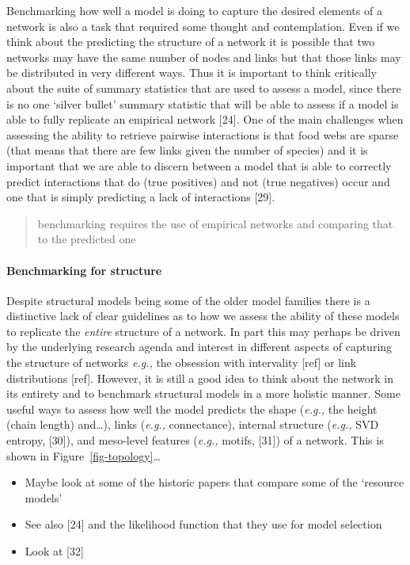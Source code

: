 \documentclass[
]{article}
\let\oldparagraph\paragraph
\renewcommand{\paragraph}[1]{\oldparagraph{#1}\mbox{}}
\begin{document}
Benchmarking how well a model is doing to capture the desired elements
of a network is also a task that required some thought and
contemplation. Even if we think about the predicting the structure of a
network it is possible that two networks may have the same number of
nodes and links but that those links may be distributed in very
different ways. Thus it is important to think critically about the suite
of summary statistics that are used to assess a model, since there is no
one `silver bullet' summary statistic that will be able to assess if a
model is able to fully replicate an empirical network {[}24{]}. One of
the main challenges when assessing the ability to retrieve pairwise
interactions is that food webs are sparse (that means that there are few
links given the number of species) and it is important that we are able
to discern between a model that is able to correctly predict
interactions that do (true positives) and not (true negatives) occur and
one that is simply predicting a lack of interactions {[}29{]}.

\begin{quote}
benchmarking requires the use of empirical networks and comparing that
to the predicted one
\end{quote}

\paragraph{Benchmarking for structure}\label{benchmarking-for-structure}

Despite structural models being some of the older model families there
is a distinctive lack of clear guidelines as to how we assess the
ability of these models to replicate the \emph{entire} structure of a
network. In part this may perhaps be driven by the underlying research
agenda and interest in different aspects of capturing the structure of
networks \emph{e.g.,} the obsession with intervality {[}ref{]} or link
distributions {[}ref{]}. However, it is still a good idea to think about
the network in its entirety and to benchmark structural models in a more
holistic manner. Some useful ways to assess how well the model predicts
the shape (\emph{e.g.,} the height (chain length) and\ldots), links
(\emph{e.g.,} connectance), internal structure (\emph{e.g.,} SVD
entropy, {[}30{]}), and meso-level features (\emph{e.g.,} motifs,
{[}31{]}) of a network. This is shown in
Figure~\ref{fig-topology}\ldots{}

\begin{itemize}
\item
  Maybe look at some of the historic papers that compare some of the
  `resource models'
\item
  See also {[}24{]} and the likelihood function that they use for model
  selection
\item
  Look at {[}32{]}
\end{itemize}
\end{document}
